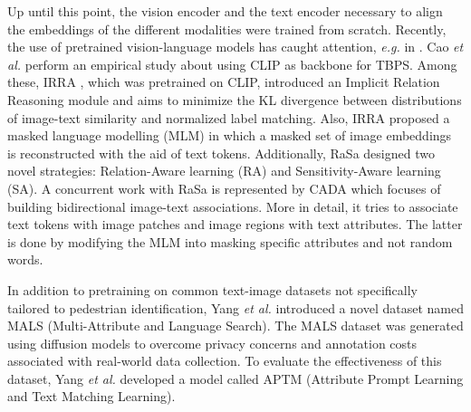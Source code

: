 \documentclass[acmsmall]{acmart}
\newcommand{\anote}[1]{\textcolor{red}{AP: #1}}
\begin{document}
Up until this point, the vision encoder and the text encoder necessary to align the embeddings of the different modalities were trained from scratch. Recently, the use of pretrained vision-language models has caught attention, \textit{e.g.} in \cite{shu2022see, yan2023clip, cao2024empirical, yan2023CLIPdrive}. Cao \textit{et al.} \cite{yan2023clip} perform an empirical study about using CLIP \cite{radford2021learning} as backbone for TBPS. Among these, IRRA \cite{jiang2023cross}, which was pretrained on CLIP, introduced an Implicit Relation Reasoning module and aims to minimize the KL divergence between distributions of image-text similarity and normalized label matching. Also, IRRA proposed a masked language modelling (MLM) in which a masked set of image embeddings is reconstructed with the aid of text tokens.  Additionally, RaSa \cite{bai2023rasa} designed two novel strategies: Relation-Aware learning (RA) and Sensitivity-Aware learning (SA). A concurrent work with RaSa is represented by CADA \cite{lin2024cross} which focuses of building bidirectional image-text associations. More in detail, it tries to associate text tokens with image patches and image regions with text attributes. The latter is done by modifying the MLM into masking specific attributes and not random words.

In addition to pretraining on common text-image datasets not specifically tailored to pedestrian identification, Yang \textit{et al.} \cite{yang2023towards} introduced a novel dataset named MALS (Multi-Attribute and Language Search). %
The MALS dataset was generated using diffusion models to overcome privacy concerns and annotation costs associated with real-world data collection. To evaluate the effectiveness of this dataset, Yang \textit{et al.} developed a model called APTM (Attribute Prompt Learning and Text Matching Learning).


\end{document}
